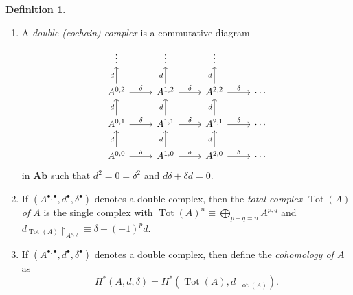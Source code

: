 \documentclass[10pt,letterpaper,cm]{nupset}
\theoremstyle{definition}
\newtheorem{definition}{Definition}[subsection]
\theoremstyle{theorem}
\theoremstyle{remark}
\newcommand{\1}{\mathbb{1}}
\newcommand{\0}{\vec 0}
\DeclareMathOperator{\tot}{Tot}
\begin{document}
\newpage


\begin{definition} $ $
\begin{enumerate}
\item A \textit{double (cochain) complex} is a commutative diagram 
\[
\begin{tikzcd}
\vdots                                       & \vdots                                       & \vdots                                       &        \\
{A^{0,2}} \arrow[u, "d"] \arrow[r, "\delta"] & {A^{1,2}} \arrow[u, "d"] \arrow[r, "\delta"] & {A^{2,2}} \arrow[u, "d"] \arrow[r, "\delta"] & \cdots \\
{A^{0,1}} \arrow[u, "d"] \arrow[r, "\delta"] & {A^{1,1}} \arrow[u, "d"] \arrow[r, "\delta"] & {A^{2,1}} \arrow[u, "d"] \arrow[r, "\delta"] & \cdots \\
{A^{0,0}} \arrow[u, "d"] \arrow[r, "\delta"] & {A^{1,0}} \arrow[u, "d"] \arrow[r, "\delta"] & {A^{2,0}} \arrow[u, "d"] \arrow[r, "\delta"] & \cdots
\end{tikzcd}
\] in $\mathbf{Ab}$ such that $d^2 = 0 = \delta^2$ and $d{\delta} + \delta{d} =0$.
\item If $(A^{\bullet, \bullet}, d^{\bullet}, \delta^{\bullet})$ denotes a double complex, then the \textit{total complex $\tot(A)$ of $A$} is the single complex with $\tot(A)^n \equiv \bigoplus_{p+q = n} A^{p,q}$ and $d_{\tot(A)} \restriction_{A^{p,q}} \equiv  \delta + ({-}1)^pd$.
\item If $(A^{\bullet, \bullet}, d^{\bullet}, \delta^{\bullet})$ denotes a double complex, then define the \textit{cohomology of $A$} as $$H^{\ast}(A, d, \delta) = H^{\ast}(\tot(A), d_{\tot(A)}).$$
\end{enumerate}
\end{definition}
\end{document}
